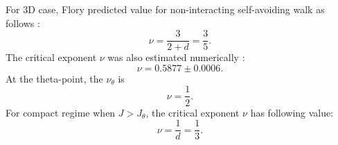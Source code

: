 For 3D case, Flory predicted value for non-interacting self-avoiding walk as follows \cite{flory1953principles}:
\begin{equation}
\label{eq:nu_3D_J0_flory}
 \nu = \frac{3}{2+d} = \frac{3}{5}.
\end{equation}
The critical exponent $\nu$ was also estimated numerically \cite{Li1995}:
\begin{equation}
\label{eq:nu_3D_J0_sokal}
\nu = 0.5877 \pm 0.0006.
\end{equation}
 At the theta-point, the $\nu_{\theta}$  is \cite{van2015statistical} 
 \begin{equation}
 \label{eq:nu_3D_Jtheta_flory}
 \nu = \frac{1}{2}.
 \end{equation}
 For compact regime when $J > J_{\theta}$, the critical exponent $\nu$  has following value:  
\begin{equation}
\label{eq:nu_3D_Jglobular_flory}
\nu = \frac{1}{d} = \frac{1}{3}.
\end{equation}
